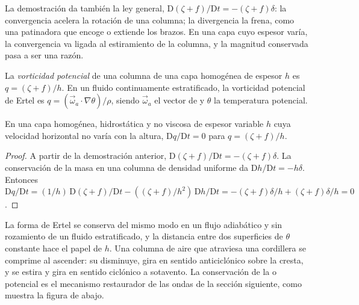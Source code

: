 La demostración da también la ley general, $\mathrm D(\zeta + f)/\mathrm Dt =
-(\zeta + f)\delta$: la convergencia acelera la rotación de una columna; la divergencia la
frena, como una patinadora que encoge o extiende los brazos. En una capa cuyo
espesor varía, la convergencia va ligada al estiramiento de la columna, y
la magnitud conservada pasa a ser una razón.

\begin{definition}\label{def:b3:atmospheric-dynamics:pv}
La \emph{vorticidad potencial} de una columna de una
capa homogénea de espesor $h$ es $q = (\zeta + f)/h$. En un fluido continuamente
estratificado, la vorticidad potencial de Ertel es $q = (\vec\omega_a\cdot
\nabla\theta)/\rho$, siendo $\vec\omega_a$ el vector de  y
$\theta$ la temperatura potencial.
\end{definition}

\begin{theorem}\label{thm:b3:atmospheric-dynamics:pv}
En una capa homogénea, hidrostática y no viscosa de espesor variable $h$ cuya
velocidad horizontal no varía con la altura, $\mathrm Dq/\mathrm Dt = 0$
para $q = (\zeta + f)/h$.
\end{theorem}

\begin{proof}
A partir de la demostración anterior, $\mathrm D(\zeta + f)/\mathrm Dt = -(\zeta + f)\delta$.
La conservación de la masa en una columna de densidad uniforme da $\mathrm Dh/\mathrm
Dt = -h\delta$. Entonces $\mathrm Dq/\mathrm Dt = (1/h)\,\mathrm D(\zeta +
f)/\mathrm Dt - ((\zeta + f)/h^2)\,\mathrm Dh/\mathrm Dt = -(\zeta +
f)\delta/h + (\zeta + f)\delta/h = 0$.
\end{proof}

La forma de Ertel se conserva del mismo modo en un flujo adiabático y sin rozamiento
de un fluido estratificado, y la distancia entre dos superficies de $\theta$
constante hace el papel de $h$. Una columna de aire que atraviesa una
cordillera se comprime al ascender: su  disminuye, gira en
sentido anticiclónico sobre la cresta, y se estira y gira en sentido ciclónico
a sotavento. La conservación de la  o potencial es el
mecanismo restaurador de las ondas de la sección siguiente, como muestra la
figura de abajo.

